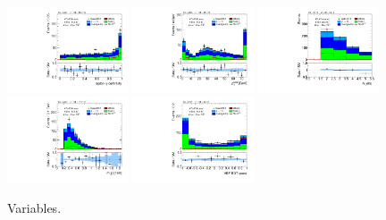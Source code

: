 \begin{figure}[tp]
  \includegraphics[width=0.32\textwidth]{figures/analysis/vbf-topCR/lep-eta-centrality}
  \includegraphics[width=0.32\textwidth]{figures/analysis/vbf-topCR/system-pt}
  \includegraphics[width=0.32\textwidth]{figures/analysis/vbf-topCR/n-jets30}
  \includegraphics[width=0.32\textwidth]{figures/analysis/vbf-topCR/dijet-m-veryhigh}
  \includegraphics[width=0.32\textwidth]{figures/analysis/vbf-topCR/BDTEve-VBF}
  \caption{Variables.}
  \label{fig:backgrounds-topCR-jets}
\end{figure}

